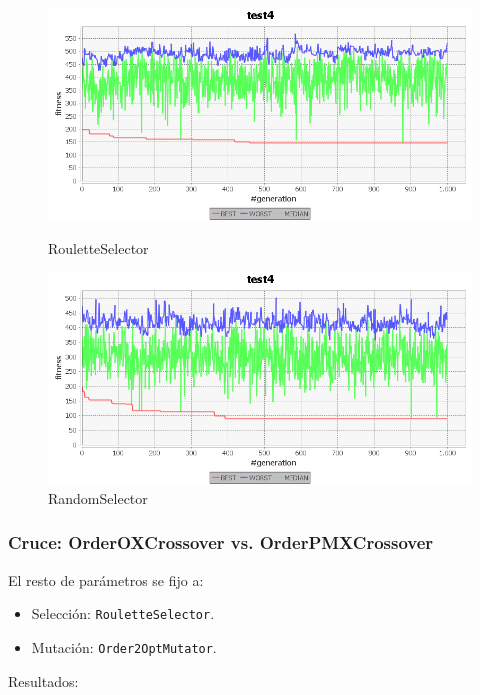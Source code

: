 \documentclass[a4paper,12pt,titlepage]{article}
\begin{document}
\begin{figure}[!ht]
\centering
\begin{minipage}{.5\textwidth}
  \centering
  \includegraphics[width=\textwidth]{RouletteSelector.png}
  \caption{RouletteSelector}
\end{minipage}%
\begin{minipage}{.5\textwidth}
  \centering
  \includegraphics[width=\textwidth]{RandomSelector.png}
  \caption{RandomSelector}
\end{minipage}
\end{figure}

\subsubsection{Cruce: OrderOXCrossover vs. OrderPMXCrossover}

El resto de parámetros se fijo a:

\begin{itemize}[noitemsep]
	\item Selección: \lstinline|RouletteSelector|.
	\item Mutación: \lstinline|Order2OptMutator|.	
\end{itemize}

Resultados:
 
\end{document}
